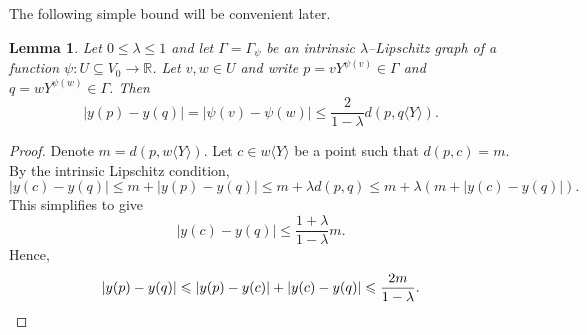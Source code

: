\documentclass[11pt,reqno]{amsart}
\newcommand{\R}{\mathbb{R}}
\newcommand{\0}{\mathbf{0}}
\renewcommand{\1}{\mathbf 1}
\newcommand{\from}{\colon}
\renewcommand{\subset}{\subseteq}
\renewcommand{\le}{\leqslant}
\newtheorem{lemma}[thm]{Lemma}
\theoremstyle{remark}
\begin{document}
The following simple bound will be convenient later.
\begin{lemma}\label{lem:ilg line distance}
  Let $0\le \lambda\le 1$ and let $\Gamma=\Gamma_\psi$ be an intrinsic $\lambda$--Lipschitz graph of a function $\psi\from U\subset V_0\to \R$.  Let $v, w\in U$ and write $p=vY^{\psi(v)}\in \Gamma$ and $q=wY^{\psi(w)}\in \Gamma$.  Then
  $$|y(p)-y(q)|=|\psi(v)-\psi(w)|\le \frac{2}{1-\lambda} d(p, q\langle Y\rangle).$$
\end{lemma}
\begin{proof}
  Denote $m=d(p, w\langle Y\rangle)$. Let $c\in w\langle Y\rangle$ be a point such that $d(p,c)=m$.  By the intrinsic Lipschitz condition,
  $$|y(c)-y(q)|\le m+|y(p)-y(q)|\le m + \lambda d(p,q) \le m + \lambda (m + |y(c)-y(q)|).$$
 This simplifies to give
 $$
 |y(c)-y(q)|\le \frac{1+\lambda}{1-\lambda}m.
 $$
 Hence,
  \begin{equation*}
  |y(p)-y(q)| \le |y(p)-y(c)|+|y(c)-y(q)|\le \frac{2m}{1-\lambda}.\qedhere
  \end{equation*}
\end{proof}
\end{document}
